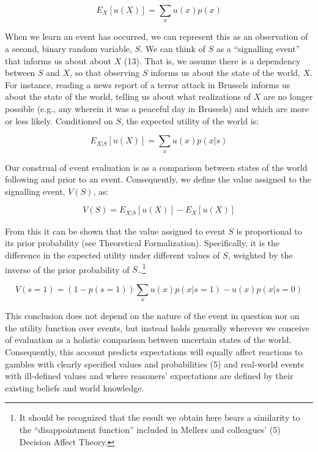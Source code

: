 \documentclass[9pt,twocolumn,twoside,]{pnas-new}
\begin{document}
\begin{equation*}
E_X[u(X)] = \sum_x u(x)p(x)
\end{equation*}

When we learn an event has occurred, we can represent this as an
observation of a second, binary random variable, \(S\). We can think of
\(S\) as a ``signalling event'' that informs us about about \(X\) (13).
That is, we assume there is a dependency between \(S\) and \(X\), so
that observing \(S\) informs us about the state of the world, \(X\). For
instance, reading a news report of a terror attack in Brussels informs
us about the state of the world, telling us about what realizations of
\(X\) are no longer possible (e.g., any wherein it was a peaceful day in
Brussels) and which are more or less likely. Conditioned on \(S\), the
expected utility of the world is:

\begin{equation*}
E_{X|S}[u(X)] = \sum_x u(x)p(x|s)
\end{equation*}

Our construal of event evaluation is as a comparison between states of
the world following and prior to an event. Consequently, we define the
value assigned to the signalling event, \(V(S)\), as:

\begin{equation*}
V(S) = E_{X|S}[u(X)] - E_X[u(X)]
\end{equation*}

From this it can be shown that the value assigned to event \(S\) is
proportional to its prior probability (see Theoretical Formalization).
Specifically, it is the difference in the expected utility under
different values of \(S\), weighted by the inverse of the prior
probability of \(S\)..\footnote{It should be recognized that the result
  we obtain here bears a similarity to the ``disappointment function''
  included in Mellers and colleagues' (5) Decision Affect Theory.}

\begin{equation*}
V(s=1)=(1-p(s=1))\sum_x u(x)p(x|s=1) - u(x)p(x|s=0)
\end{equation*}

This conclusion does not depend on the nature of the event in question
nor on the utility function over events, but instead holds generally
wherever we conceive of evaluation as a holistic comparison between
uncertain states of the world. Consequently, this account predicts
expectations will equally affect reactions to gambles with clearly
specified values and probabilities (5) and real-world events with
ill-defined values and where reasoners' expectations are defined by
their existing beliefs and world knowledge.
\end{document}
